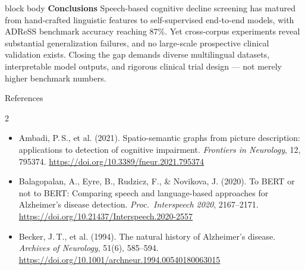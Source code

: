\documentclass[final]{beamer}
\newlength{\rightcol}
\begin{document}
\begin{frame}[t]
\begin{columns}[T, totalwidth=\linewidth]
\begin{column}{\rightcol}
\end{column}
\end{columns}

\vspace{1.2cm}

\begin{beamercolorbox}[
  wd=\linewidth,
  sep=0.7cm,
  rounded=true,
  shadow=false
]{block body}
  {\large\bfseries\color{Cprimary} Conclusions}\quad
  Speech-based cognitive decline screening has matured from
  hand-crafted linguistic features to self-supervised end-to-end
  models, with ADReSS benchmark accuracy reaching 87\%.
  Yet cross-corpus experiments reveal substantial generalization
  failures, and no large-scale prospective clinical validation
  exists.
  Closing the gap demands diverse multilingual datasets,
  interpretable model outputs, and rigorous clinical trial design ---
  not merely higher benchmark numbers.
\end{beamercolorbox}

\vspace{0.9cm}

\begin{block}{References}
\footnotesize\setlength{\columnsep}{2cm}
\begin{multicols}{2}
\begin{itemize}[leftmargin=0pt, label={}, itemsep=0.18em]
  \item Ambadi, P.\,S., et al. (2021). Spatio-semantic graphs from
        picture description: applications to detection of cognitive
        impairment. \textit{Frontiers in Neurology}, 12, 795374.
        \url{https://doi.org/10.3389/fneur.2021.795374}

  \item Balagopalan, A., Eyre, B., Rudzicz, F., \& Novikova, J.
        (2020). To BERT or not to BERT: Comparing speech and
        language-based approaches for Alzheimer's disease detection.
        \textit{Proc.\ Interspeech 2020}, 2167--2171.
        \url{https://doi.org/10.21437/Interspeech.2020-2557}

  \item Becker, J.\,T., et al. (1994). The natural history of
        Alzheimer's disease. \textit{Archives of Neurology},
        51(6), 585--594.
        \url{https://doi.org/10.1001/archneur.1994.00540180063015}


\end{itemize}
\end{multicols}
\end{block}
\end{frame}
\end{document}
